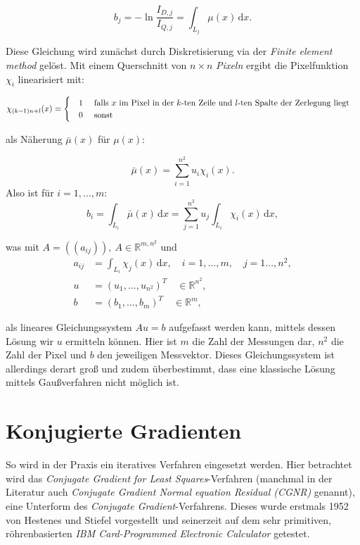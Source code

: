 \begin{equation}
b_{j}
= - \ln{\frac{I_{D,j}}{I_{Q,j}}}
=\int _{L_j}\mu(x)\,\mathrm {d} x.
\end{equation}

Diese Gleichung wird zunächst durch Diskretisierung via der \textit{Finite element method} gelöst. Mit einem Querschnitt von $n\times n$ \textit{Pixeln} ergibt die Pixelfunktion $ \chi_i $ linearisiert mit:

\begin{equation}
\chi_{(k-1)n+l}(x)= 
\begin{cases}
\quad 1 \text{ \quad falls } x \text{ im Pixel in der } k\text{-ten Zeile und } l\text{-ten Spalte der Zerlegung liegt} \\
\quad 0 \text{ \quad sonst}
\end{cases}
\end{equation}

als Näherung $ \bar{\mu}(x) $ für $ \mu(x) $:

\begin{equation}
 \bar{\mu}(x) = \sum_{i = 1}^{n^2}  u_i \chi_i(x).
 \end{equation}
Also ist für $i=1,\dots,m$:
\begin{equation}
b_{i}
=\int _{L_i}\bar{\mu}(x)\,\mathrm {d} x =  \sum_{j = 1}^{n^2}  u_j \int_{L_i} \chi_i(x)\, \mathrm {d} x ,
\end{equation}

was mit $ A=((a_{ij})),\ A\in \mathbb{R}^{m,n^2}$ und
\begin{align}
    a_{ij} &=  \int_{L_i} \chi_j(x)\, \mathrm {d} x, \quad i=1,\dots,m,\quad j=1\dots,n^2,  \\
        u &= (u_1,\dots,u_{n^2})^T \quad \in \mathbb{R}^{n^2},\\
        b &= (b_1,\dots,b_{m})^T \quad \in \mathbb{R}^{m},
\end{align}

als lineares Gleichungssystem $Au=b$ aufgefasst werden kann, mittels dessen Lösung wir $u$ ermitteln können.
Hier ist $m$ die Zahl der Messungen dar, $n^2$ die Zahl der Pixel und $b$ den jeweiligen Messvektor.
Dieses Gleichungssystem ist allerdings derart groß und zudem überbestimmt, dass eine klassische Lösung mittels Gaußverfahren nicht möglich ist.

\section{Konjugierte Gradienten}
So wird in der Praxis ein iteratives Verfahren eingesetzt werden.
Hier betrachtet wird das \textit{Conjugate Gradient for Least Squares}-Verfahren (manchmal in der Literatur auch \textit{Conjugate Gradient Normal equation Residual (CGNR)} genannt),
eine Unterform des \textit{Conjugate Gradient}-Verfahrens.
Dieses wurde erstmals 1952 von Hestenes und Stiefel vorgestellt \cite{Hestenes1952} und seinerzeit auf dem sehr primitiven, röhrenbasierten \textit{IBM Card-Programmed Electronic Calculator} \cite{ibm603} getestet.

